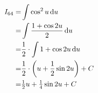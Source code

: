 \def\no{64}
\def\theintegral{\(\int\cos^2{u}\;\dif{u}
\enspace=\enspace%
\tfrac{1}{2}\,{u}\;+\;\tfrac{1}{4}\,\sin{2{u}}\;+\;C\)}

\begin{align*}
{I}_{\no}
=&  \int  \cos^2{u} \dif u \\
=&  \int  \frac{1+\cos{2u}}{2} \dif u \\
=&  \frac{1}{2}\cdot\int  1+\cos{2u}  \dif u \\
=&  \frac{1}{2}\cdot \left(
      {u}+\frac{1}{2}\sin{2u}
    \right) + C \\
=&  \tfrac{1}{2} {u}
   +\tfrac{1}{4} \sin{2{u}} + C
\\
\end{align*}
